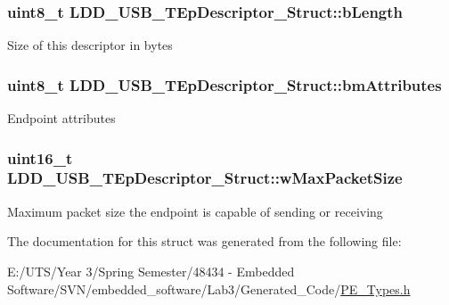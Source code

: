 \subsubsection[{b\+Length}]{\setlength{\rightskip}{0pt plus 5cm}uint8\+\_\+t L\+D\+D\+\_\+\+U\+S\+B\+\_\+\+T\+Ep\+Descriptor\+\_\+\+Struct\+::b\+Length}\label{struct_l_d_d___u_s_b___t_ep_descriptor___struct_ad4cc2b6088c7fb913f40eada94098393}
Size of this descriptor in bytes \hypertarget{struct_l_d_d___u_s_b___t_ep_descriptor___struct_a7a3e6205355d7fa84899f23ac8e58490}{}
\subsubsection[{bm\+Attributes}]{\setlength{\rightskip}{0pt plus 5cm}uint8\+\_\+t L\+D\+D\+\_\+\+U\+S\+B\+\_\+\+T\+Ep\+Descriptor\+\_\+\+Struct\+::bm\+Attributes}\label{struct_l_d_d___u_s_b___t_ep_descriptor___struct_a7a3e6205355d7fa84899f23ac8e58490}
Endpoint attributes \hypertarget{struct_l_d_d___u_s_b___t_ep_descriptor___struct_a19e3e6b0524f2fcd25377f008c94c3c6}{}
\subsubsection[{w\+Max\+Packet\+Size}]{\setlength{\rightskip}{0pt plus 5cm}uint16\+\_\+t L\+D\+D\+\_\+\+U\+S\+B\+\_\+\+T\+Ep\+Descriptor\+\_\+\+Struct\+::w\+Max\+Packet\+Size}\label{struct_l_d_d___u_s_b___t_ep_descriptor___struct_a19e3e6b0524f2fcd25377f008c94c3c6}
Maximum packet size the endpoint is capable of sending or receiving 

The documentation for this struct was generated from the following file\+:\begin{DoxyCompactItemize}
\item 
E\+:/\+U\+T\+S/\+Year 3/\+Spring Semester/48434 -\/ Embedded Software/\+S\+V\+N/embedded\+\_\+software/\+Lab3/\+Generated\+\_\+\+Code/\hyperlink{_p_e___types_8h}{P\+E\+\_\+\+Types.\+h}\end{DoxyCompactItemize}
